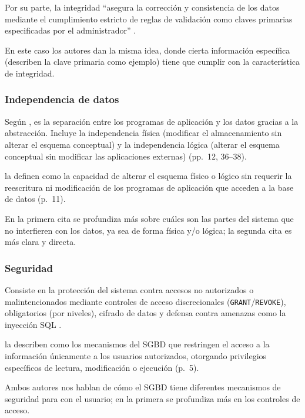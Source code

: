 Por su parte, la integridad \enquote{asegura la corrección y consistencia de los datos mediante el cumplimiento estricto de reglas de validación como claves primarias especificadas por el administrador} \parencite[p.~5]{silberschatz_dbconcepts}.

En este caso los autores dan la misma idea, donde cierta información específica (describen la clave primaria como ejemplo) tiene que cumplir con la característica de integridad.

\subsubsection{Independencia de datos}

Según \textcite{elmasri_navathe}, es la separación entre los programas de aplicación y los datos gracias a la abstracción. Incluye la independencia física (modificar el almacenamiento sin alterar el esquema conceptual) y la independencia lógica (alterar el esquema conceptual sin modificar las aplicaciones externas) (pp.~12, 36--38).

\textcite{silberschatz_dbconcepts} la definen como la capacidad de alterar el esquema físico o lógico sin requerir la reescritura ni modificación de los programas de aplicación que acceden a la base de datos (p.~11).

En la primera cita se profundiza más sobre cuáles son las partes del sistema que no interfieren con los datos, ya sea de forma física y/o lógica; la segunda cita es más clara y directa.

\subsubsection{Seguridad}

Consiste en la protección del sistema contra accesos no autorizados o malintencionados mediante controles de acceso discrecionales (\texttt{GRANT}/\texttt{REVOKE}), obligatorios (por niveles), cifrado de datos y defensa contra amenazas como la inyección SQL \parencite[p.~21]{elmasri_navathe}.

\textcite{silberschatz_dbconcepts} la describen como los mecanismos del SGBD que restringen el acceso a la información únicamente a los usuarios autorizados, otorgando privilegios específicos de lectura, modificación o ejecución (p.~5).

Ambos autores nos hablan de cómo el SGBD tiene diferentes mecanismos de seguridad para con el usuario; en la primera se profundiza más en los controles de acceso.

